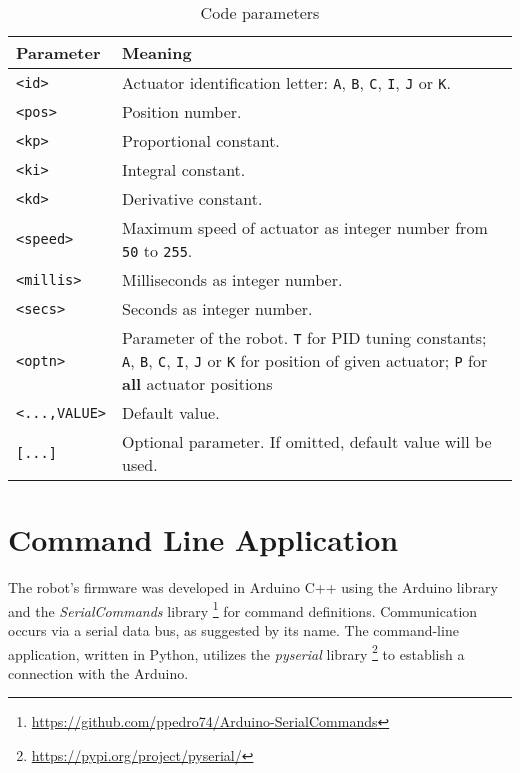 \begingroup
\setlength{\tabcolsep}{10pt}
\renewcommand{\arraystretch}{1.5}
\begin{table}[H]
    \centering
    \caption{Code parameters}
    \label{tab:code-parameters}
    \begin{tabular}{p{}p{}}
    \toprule
    Parameter & Meaning \\ \midrule
    \texttt{<id>} & Actuator identification letter: \texttt{A}, \texttt{B}, \texttt{C}, \texttt{I}, \texttt{J} or \texttt{K}. \\
    \texttt{<pos>} & Position number. \\
    \texttt{<kp>} & Proportional constant. \\
    \texttt{<ki>} & Integral constant. \\
    \texttt{<kd>} & Derivative constant. \\
    \texttt{<speed>} & Maximum speed of actuator as integer number from \texttt{50} to \texttt{255}. \\
    \texttt{<millis>} & Milliseconds as integer number. \\
    \texttt{<secs>} & Seconds as integer number. \\
    \texttt{<optn>} & Parameter of the robot. \texttt{T} for PID tuning constants; \texttt{A}, \texttt{B}, \texttt{C}, \texttt{I}, \texttt{J} or \texttt{K} for position of given actuator; \texttt{P} for \textbf{all} actuator positions\\
    \texttt{<...,VALUE>} & Default value. \\
    \texttt{[...]} & Optional parameter. If omitted, default value will be used. \\
    \bottomrule
    \end{tabular}
\end{table}
\endgroup

\section{Command Line Application}

The robot's firmware was developed in Arduino C++ using the Arduino library and the \textit{SerialCommands} library \footnote{\url{https://github.com/ppedro74/Arduino-SerialCommands}} for command definitions. Communication occurs via a serial data bus, as suggested by its name. The command-line application, written in Python, utilizes the \textit{pyserial} library \footnote{\url{https://pypi.org/project/pyserial/}} to establish a connection with the Arduino.


